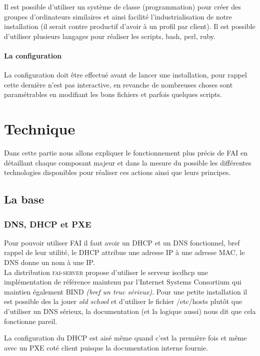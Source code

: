 \documentclass[a4paper,12pt,one side,titlepage]{report}
\begin{document}
Il est possible d'utiliser un système de classe (programmation) pour créer des groupes d'ordinateurs similaires et ainsi facilité l'industrialisation de notre installation (il serait contre productif d'avoir à un profil par client). Il est possible d'utiliser plusieurs langages pour réaliser les scripts, bash, perl, ruby.

\subsubsection{La configuration}
La configuration doit être effectué avant de lancer une installation, pour rappel cette dernière n'est pas interactive, en revanche de nombreuses choses sont paramétrables en modifiant les bons fichiers et parfois quelques scripts.


\chapter{Technique}
Dans cette partie nous allons expliquer le fonctionnement plus précis de FAI en détaillant chaque composant majeur et dans la mesure du possible les différentes technologies disponibles pour réaliser ces actions ainsi que leurs principes.

\section{La base}


\subsection{DNS, DHCP et PXE}
Pour pouvoir utiliser \textsc{FAI} il faut avoir un DHCP et un DNS fonctionnel, bref rappel de leur utilité, le DHCP attribue une adresse IP à une adresse MAC, le DNS donne un nom à une IP.\\
La distribution \textsc{fai-server} propose d'utiliser le serveur iscdhcp une implémentation de référence maintenu par l'Internet Systems Consortium qui maintien également BIND \textit{(bref un truc sérieux)}. 
Pour une petite installation il est possible des la jouer \textit{old school} et d'utiliser le fichier /etc/hosts plutôt que d'utiliser un DNS sérieux, la documentation (et la logique aussi) nous dit que cela fonctionne pareil.

La configuration du DHCP est aisé même quand c'est la première fois et même avec un PXE coté client puisque la documentation interne fournie.
\end{document}

